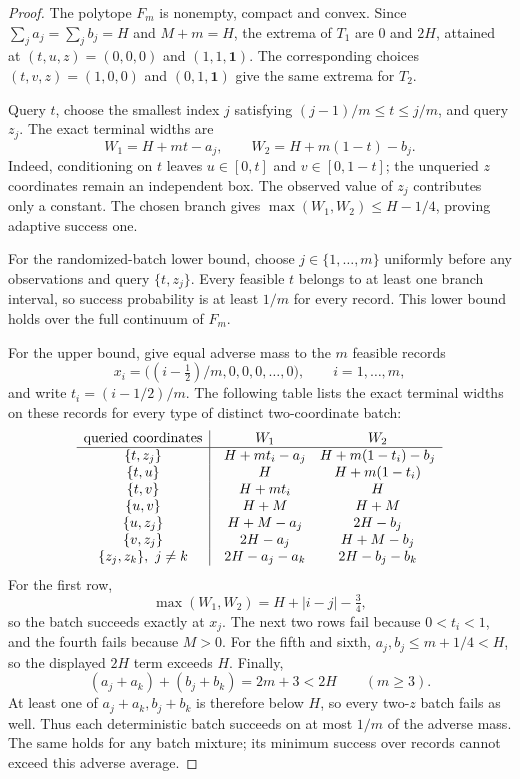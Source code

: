 \documentclass[12pt]{article}
\begin{document}
\begin{proof}
The polytope $F_m$ is nonempty, compact and convex. Since
$\sum_j a_j=\sum_j b_j=H$ and $M+m=H$, the extrema of $T_1$ are
$0$ and $2H$, attained at $(t,u,z)=(0,0,0)$ and $(1,1,\boldsymbol1)$.
The corresponding choices $(t,v,z)=(1,0,0)$ and
$(0,1,\boldsymbol1)$ give the same extrema for $T_2$.

Query $t$, choose the smallest index $j$ satisfying
$(j-1)/m\leq t\leq j/m$, and query $z_j$. The exact terminal widths are
\begin{equation}
 W_1=H+mt-a_j,\qquad W_2=H+m(1-t)-b_j.
 \label{eq:two-target-boundary-widths}
\end{equation}
Indeed, conditioning on $t$ leaves $u\in[0,t]$ and $v\in[0,1-t]$;
the unqueried $z$ coordinates remain an independent box. The observed
value of $z_j$ contributes only a constant. The chosen branch gives
$\max(W_1,W_2)\leq H-1/4$, proving adaptive success one.

For the randomized-batch lower bound, choose $j\in\{1,\ldots,m\}$ uniformly before any
observations and query $\{t,z_j\}$. Every feasible $t$ belongs to at least
one branch interval, so success probability is at least $1/m$ for every
record. This lower bound holds over the full continuum of $F_m$.

For the upper bound, give equal adverse mass to the $m$ feasible records
\[
 x_i=\bigl((i-\tfrac12)/m,0,0,0,\ldots,0\bigr),
       \qquad i=1,\ldots,m,
\]
and write $t_i=(i-1/2)/m$. The following table lists the exact terminal
widths on these records for every type of distinct two-coordinate batch:
\[
\begin{array}{c|@{\quad}c@{\quad}c}
\text{queried coordinates}&W_1&W_2\\\hline
\{t,z_j\}&H+mt_i-a_j&H+m(1-t_i)-b_j\\
\{t,u\}&H&H+m(1-t_i)\\
\{t,v\}&H+mt_i&H\\
\{u,v\}&H+M&H+M\\
\{u,z_j\}&H+M-a_j&2H-b_j\\
\{v,z_j\}&2H-a_j&H+M-b_j\\
\{z_j,z_k\},\ j\ne k&2H-a_j-a_k&2H-b_j-b_k
\end{array}
\]
For the first row,
\[
 \max(W_1,W_2)=H+|i-j|-\tfrac34,
\]
so the batch succeeds exactly at $x_j$. The next two rows fail because
$0<t_i<1$, and the fourth fails because $M>0$. For the fifth and sixth,
$a_j,b_j\leq m+1/4<H$, so the displayed $2H$ term exceeds $H$.
Finally,
\[
 (a_j+a_k)+(b_j+b_k)=2m+3<2H \qquad(m\geq3).
\]
At least one of $a_j+a_k,b_j+b_k$ is therefore below $H$, so every
two-$z$ batch fails as well. Thus each deterministic batch succeeds on
at most $1/m$ of the adverse mass. The same holds for any batch mixture;
its minimum success over records cannot exceed this adverse average.


\end{proof}
\end{document}
